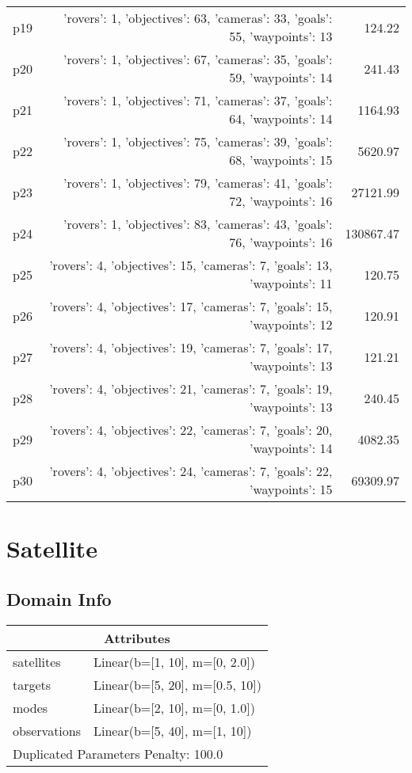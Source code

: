 \documentclass{article}
\begin{document}
\begin{center}
\begin{tabular}{@{}l|r|r@{}}
  p19&{'rovers': 1, 'objectives': 63, 'cameras': 33, 'goals': 55, 'waypoints': 13}&124.22\\
  p20&{'rovers': 1, 'objectives': 67, 'cameras': 35, 'goals': 59, 'waypoints': 14}&241.43\\
  p21&{'rovers': 1, 'objectives': 71, 'cameras': 37, 'goals': 64, 'waypoints': 14}&1164.93\\
  p22&{'rovers': 1, 'objectives': 75, 'cameras': 39, 'goals': 68, 'waypoints': 15}&5620.97\\
  p23&{'rovers': 1, 'objectives': 79, 'cameras': 41, 'goals': 72, 'waypoints': 16}&27121.99\\
  p24&{'rovers': 1, 'objectives': 83, 'cameras': 43, 'goals': 76, 'waypoints': 16}&130867.47\\
  p25&{'rovers': 4, 'objectives': 15, 'cameras': 7, 'goals': 13, 'waypoints': 11}&120.75\\
  p26&{'rovers': 4, 'objectives': 17, 'cameras': 7, 'goals': 15, 'waypoints': 12}&120.91\\
  p27&{'rovers': 4, 'objectives': 19, 'cameras': 7, 'goals': 17, 'waypoints': 13}&121.21\\
  p28&{'rovers': 4, 'objectives': 21, 'cameras': 7, 'goals': 19, 'waypoints': 13}&240.45\\
  p29&{'rovers': 4, 'objectives': 22, 'cameras': 7, 'goals': 20, 'waypoints': 14}&4082.35\\
  p30&{'rovers': 4, 'objectives': 24, 'cameras': 7, 'goals': 22, 'waypoints': 15}&69309.97
                            \end{tabular}
                            \end{center}
                    
                            \newpage \section{Satellite}
                    \subsection*{Domain Info}

                    \begin{center}
                    \begin{tabular}{@{}p{}p{}@{}}
                    \multicolumn{2}{c}{\bf \large Attributes}\\\midrule
                    satellites & Linear(b=[1, 10], m=[0, 2.0])\\
targets & Linear(b=[5, 20], m=[0.5, 10])\\
modes & Linear(b=[2, 10], m=[0, 1.0])\\
observations & Linear(b=[5, 40], m=[1, 10])
                    
                     \\\midrule
                    \multicolumn{2}{l}{Duplicated Parameters Penalty: 100.0}
                    \end{tabular}
                    \end{center}
                
\end{document}
